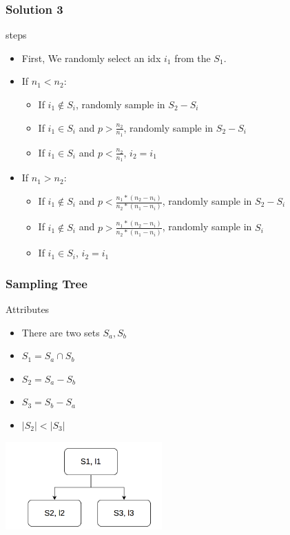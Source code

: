 \documentclass[notheorems, aspectratio=54]{beamer}
\begin{document}
\begin{frame}
    \frametitle{Solution 3}
        \begin{block} {steps}
            \begin{itemize}
                \item First, We randomly select an idx $i_1$ from the $S_1$.
                \item If $n_1 < n_2$:
                \begin{itemize}
                    \item If $i_1 \notin S_i$, randomly sample in $S_2-S_i$
                    \item If $i_1 \in S_i$ and $p > \frac{n_2}{n_1}$, randomly sample in $S_2-S_i$
                    \item If $i_1 \in S_i$ and $p < \frac{n_2}{n_1}$, $i_2 = i_1$
                \end{itemize}
                \item If $n_1 > n_2$:
                \begin{itemize}
                    \item If $i_1 \notin S_i$ and $p < \frac{n_1*(n_2-n_i)}{n_2*(n_1-n_i)}$, randomly sample in $S_2-S_i$
                    \item If $i_1 \notin S_i$ and $p > \frac{n_1*(n_2-n_i)}{n_2*(n_1-n_i)}$, randomly sample in $S_i$
                    \item If $i_1 \in S_i$, $i_2 = i_1$
                \end{itemize}
            \end{itemize}
        \end{block}
\end{frame}

\begin{frame}
    \frametitle{Sampling Tree}
    \begin{block} {Attributes}
        \begin{itemize}
            \item There are two sets $S_a, S_b$
            \item $S_1 = S_a\cap S_b$
            \item $S_2 = S_a- S_b$
            \item $S_3 = S_b- S_a$
            \item $|S_2| < |S_3|$
        \end{itemize}
    \end{block}
    \centering
    \includegraphics[width=6cm]{global_img_dir/SamplingTree.png}
\end{frame} 
\end{document}
